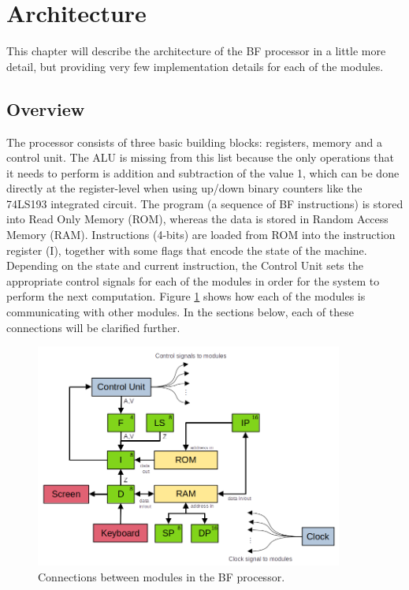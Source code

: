 \section{Architecture}
This chapter will describe the architecture of the BF processor in a little more detail, but providing very few implementation details for each of the modules.

\subsection{Overview}
The processor consists of three basic building blocks: registers, memory and a control unit. The ALU is missing from this list because the only operations that it needs to perform is addition and subtraction of the value 1, which can be done directly at the register-level when using up/down binary counters like the 74LS193 integrated circuit. The program (a sequence of BF instructions) is stored into Read Only Memory (ROM), whereas the data is stored in Random Access Memory (RAM). Instructions (4-bits) are loaded from ROM into the instruction register (I), together with some flags that encode the state of the machine. Depending on the state and current instruction, the Control Unit sets the appropriate control signals for each of the modules in order for the system to perform the next computation. Figure \ref{fig:architecture} shows how each of the modules is communicating with other modules. In the sections below, each of these connections will be clarified further.

\begin{figure}[H]
  \centering
  \includegraphics[width=0.9\textwidth]{img/bfcpu_architecture}
  \caption{Connections between modules in the BF processor.}
  \label{fig:architecture}
\end{figure}

